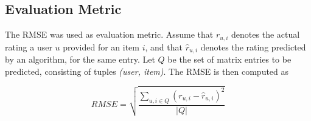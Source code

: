 \subsection{Evaluation Metric}

The \ac{RMSE} was used as evaluation metric. Assume that $r_{u,i}$ denotes the actual rating a user $u$ provided for an item $i$, and that $\hat{r}_{u,i}$ denotes the rating predicted by an algorithm, for the same entry. Let $Q$ be the set of matrix entries to be predicted, consisting of tuples \textit{(user, item)}. The \ac{RMSE} is then computed as 

\begin{equation}
    RMSE = \sqrt{\dfrac{\sum_{u,i\in Q} (r_{u,i}-\hat{r}_{u,i})^2}{|Q|}}
\end{equation}